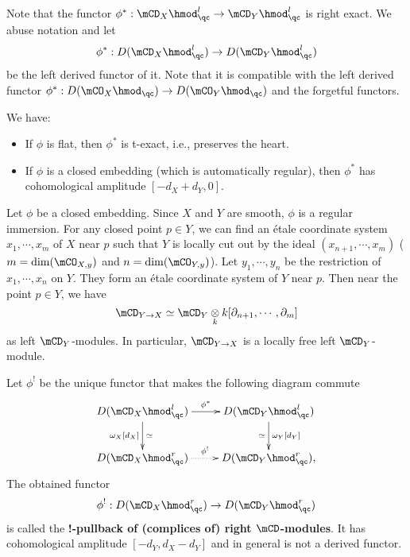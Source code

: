 	\begin{constr}
		Note that the functor $\phi^*: \mCD_X\hmod^l_\qc\to \mCD_Y\hmod^l_\qc$ is right exact. We abuse notation and let
		\[
			\phi^*: D(\mCD_X\hmod^l_\qc) \to D(\mCD_Y\hmod^l_\qc)
		\]
		be the left derived functor of it. Note that it is compatible with the left derived functor $\phi^*: D(\mCO_X\hmod_\qc) \to D(\mCO_Y\hmod_\qc)$ and the forgetful functors.
	\end{constr}

	\begin{rem}
		We have:
		\begin{itemize}
			\item If $\phi$ is flat, then $\phi^*$ is t-exact, i.e., preserves the heart.
			\item If $\phi$ is a closed embedding (which is automatically regular), then $\phi^*$ has cohomological amplitude $[-d_X+d_Y,0]$.
		\end{itemize}
	\end{rem}

	\begin{exam}
		Let $\phi$ be a closed embedding. Since $X$ and $Y$ are smooth, $\phi$ is a regular immersion. For any closed point $p\in Y$, we can find an étale coordinate system $x_1,\cdots,x_m$ of $X$ near $p$ such that $Y$ is locally cut out by the ideal $(x_{n+1},\cdots,x_m)$ ($m=\dim(\mCO_{X,y})$ and $n=\dim(\mCO_{Y,y})$). Let $y_1,\cdots,y_n$ be the restriction of $x_1,\cdots,x_n$ on $Y$. They form an étale coordinate system of $Y$ near $p$. Then near the point $p\in Y$, we have
		\[
			\mCD_{Y\to X} \simeq \mCD_Y\ot_k k[ \partial_{n+1},\cdots,\partial_m ]
		\]
		as left $\mCD_Y$-modules. In particular, $\mCD_{Y\to X}$ is a locally free left $\mCD_Y$-module.

		
	\end{exam}

	\begin{constr}
		Let $\phi^!$ be the unique functor that makes the following diagram commute
		\[
			\xymatrix{
				D(\mCD_X\hmod^l_\qc) \ar[r]^-{\phi^*} \ar[d]_-{\omega_X[d_X]}^-\simeq &
				D(\mCD_Y\hmod^l_\qc) \ar[d]^-{\omega_Y[d_Y]}_-\simeq \\
				D(\mCD_X\hmod^r_\qc) \ar@{.>}[r]^-{\phi^!} &
				D(\mCD_Y\hmod^r_\qc),
			}
		\]
	 	The obtained functor
		\[
			\phi^!: D(\mCD_X\hmod^r_\qc) \to D(\mCD_Y\hmod^r_\qc)
		\]
		is called the \textbf{!-pullback of (complices of) right $\mCD$-modules}. It has cohomological amplitude $[-d_Y, d_X-d_Y]$ and in general is not a derived functor.
	\end{constr}

